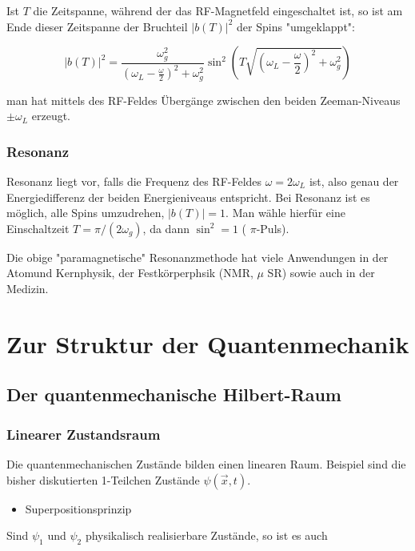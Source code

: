 \documentclass[10pt, letterpaper]{article}
\begin{document}
Ist $T$ die Zeitspanne, während der das RF-Magnetfeld eingeschaltet ist, so ist am Ende dieser Zeitspanne der Bruchteil $|b(T)|^{2}$ der Spins "umgeklappt":

$$
|b(T)|^{2}=\frac{\omega_{g}^{2}}{\left(\omega_{L}-\frac{\omega}{2}\right)^{2}+\omega_{g}^{2}} \sin ^{2}\left(T \sqrt{\left(\omega_{L}-\frac{\omega}{2}\right)^{2}+\omega_{g}^{2}}\right)
$$

man hat mittels des RF-Feldes Übergänge zwischen den beiden Zeeman-Niveaus $\pm \omega_{L}$ erzeugt.

\subsubsection*{Resonanz}
Resonanz liegt vor, falls die Frequenz des RF-Feldes $\omega=2 \omega_{L}$ ist, also genau der Energiedifferenz der beiden Energieniveaus entspricht. Bei Resonanz ist es möglich, alle Spins umzudrehen, $|b(T)|=1$. Man wähle hierfür eine Einschaltzeit $T=\pi /\left(2 \omega_{g}\right)$, da dann $\sin ^{2}=1$ ( $\pi$-Puls).

Die obige "paramagnetische" Resonanzmethode hat viele Anwendungen in der Atomund Kernphysik, der Festkörperphsik (NMR, $\mu$ SR) sowie auch in der Medizin.



\pagebreak

\section{Zur Struktur der Quantenmechanik}

\subsection*{Der quantenmechanische Hilbert-Raum}

\subsubsection*{Linearer Zustandsraum}
Die quantenmechanischen Zustände bilden einen linearen Raum. Beispiel sind die bisher diskutierten 1-Teilchen Zustände $\psi(\vec{x}, t)$.

\begin{itemize}
  \item Superpositionsprinzip
\end{itemize}

Sind $\psi_{1}$ und $\psi_{2}$ physikalisch realisierbare Zustände, so ist es auch
\end{document}
